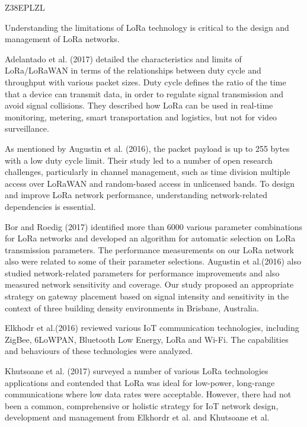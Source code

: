 \cite{chen_viable_2018}Z38EPLZL

Understanding the limitations of LoRa technology is critical to the design and management of LoRa networks.

Adelantado et al.
(2017) detailed the characteristics and limits of LoRa/LoRaWAN in terms of the relationships between duty cycle and throughput with various packet sizes.
Duty cycle defines the ratio of the time that a device can transmit data,
	in order to regulate signal transmission and avoid signal collisions.
They described how LoRa can be used in real-time monitoring,
	metering,
	smart transportation and logistics,
	but not for video surveillance.

As mentioned by Augustin et al.
(2016),
	the packet payload is up to 255 bytes with a low duty cycle limit.
Their study led to a number of open research challenges,
	particularly in channel management,
	such as time division multiple access over LoRaWAN and random-based access in unlicensed bands.
To design and improve LoRa network performance,
	understanding network-related dependencies is essential.

Bor and Roedig (2017) identified more than 6000 various parameter combinations for LoRa networks and developed an algorithm for automatic selection on LoRa transmission parameters.
The performance measurements on our LoRa network also were related to some of their parameter selections.
Augustin et al.(2016) also studied network-related parameters for performance improvements and also measured network sensitivity and coverage.
Our study proposed an appropriate strategy on gateway placement based on signal intensity and sensitivity in the context of three building density environments in Brisbane,
	Australia.

Elkhodr et al.(2016) reviewed various IoT communication technologies,
	including ZigBee, 6LoWPAN,
	Bluetooth Low Energy,
	LoRa and Wi-Fi.
The capabilities and behaviours of these technologies were analyzed.

Khutsoane et al.
(2017) surveyed a number of various LoRa technologies applications and contended that LoRa was ideal for low-power,
	long-range communications where low data rates were acceptable.
However,
	there had not been a common,
	comprehensive or holistic strategy for IoT network design,
	development and management from Elkhordr et al.
and Khutsoane et al.

